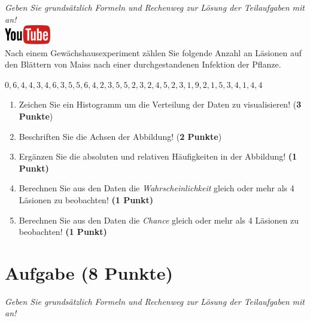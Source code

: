 \documentclass[a4paper, 9pt]{scrartcl}\usepackage[]{graphicx}\usepackage[]{xcolor}
\begin{document}
\textit{Geben Sie grunds{\"a}tzlich Formeln und Rechenweg zur L{\"o}sung der
  Teilaufgaben mit an!} \\[1Ex]

\hfill\href{https://youtu.be/aXvxGC4YLqk}{\includegraphics[width =
  2cm]{img/youtube}}\\[1Ex]



Nach einem Gew{\"a}chshausexperiment z{\"a}hlen Sie folgende Anzahl an L{\"a}sionen auf den
Bl{\"a}ttern von Maiss nach einer durchgestandenen Infektion der Pflanze. 

\begin{center}
$0, 6, 4, 4, 3, 4, 6, 3, 5, 5, 6, 4, 2, 3, 5, 5, 2, 3, 2, 4, 5, 2, 3, 1, 9, 2, 1, 5, 3, 4, 1, 4, 4$
\end{center}

\begin{enumerate}
\item Zeichen Sie ein Histogramm um die Verteilung der Daten zu visualisieren! (\textbf{3 Punkte})
\item Beschriften Sie die Achsen der Abbildung! (\textbf{2 Punkte})
\item Erg{\"a}nzen Sie die absoluten und relativen H{\"a}ufigkeiten in der
  Abbildung! \textbf{(1 Punkt)}
\item Berechnen Sie aus den Daten die \textit{Wahrscheinlichkeit}
  gleich oder mehr als 4 L{\"a}sionen zu beobachten! \textbf{(1
    Punkt)}
\item Berechnen Sie aus den Daten die \textit{Chance} gleich oder mehr
  als 4 L{\"a}sionen zu beobachten! \textbf{(1 Punkt)}
\end{enumerate}

 
\clearpage

\section{Aufgabe \hfill (8 Punkte)}

\textit{Geben Sie grunds{\"a}tzlich Formeln und Rechenweg zur L{\"o}sung der
  Teilaufgaben mit an!} \\[1Ex]
\end{document}
